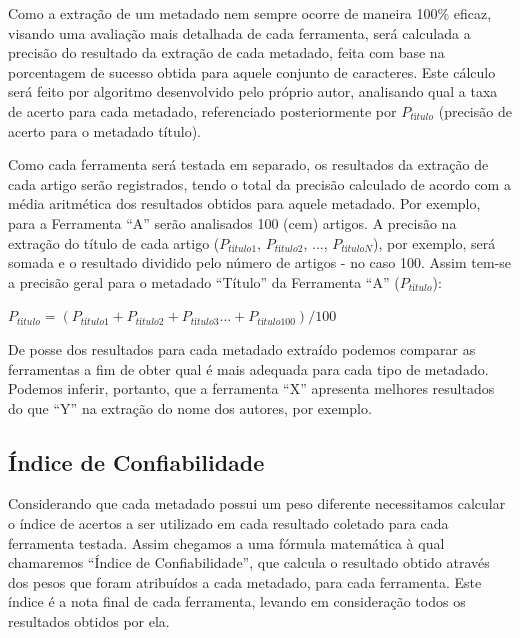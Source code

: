 Como a extração de um metadado nem sempre ocorre de maneira 100\% eficaz, visando uma avaliação mais detalhada de cada ferramenta, será calculada a precisão do resultado da extração de cada metadado, feita com base na porcentagem de sucesso obtida para aquele conjunto de caracteres. Este cálculo será feito por algoritmo desenvolvido pelo próprio autor, analisando qual a taxa de acerto para cada metadado, referenciado posteriormente por $P_{título}$ (precisão de acerto para o metadado título).

Como cada ferramenta será testada em separado, os resultados da extração de cada artigo serão registrados, tendo o total da precisão calculado de acordo com a média aritmética dos resultados obtidos para aquele metadado. Por exemplo, para a Ferramenta ``A'' serão analisados 100 (cem) artigos. A precisão na extração do título de cada artigo ($P_{título1}$, $P_{título2}$, ..., $P_{títuloN}$), por exemplo, será somada e o resultado dividido pelo número de artigos - no caso 100. Assim tem-se a precisão geral para o metadado ``Título'' da Ferramenta ``A'' ($P_{título}$):

\begin{center}
    \begin{math}
        P_{título} = (P_{título1} + P_{título2} + P_{título3} ... + P_{título100}) / 100
        \label{math:result-by-metadata}
    \end{math}
\end{center}

De posse dos resultados para cada metadado extraído podemos comparar as ferramentas a fim de obter qual é mais adequada para cada tipo de metadado. Podemos inferir, portanto, que a ferramenta ``X'' apresenta melhores resultados do que ``Y'' na extração do nome dos autores, por exemplo.

\subsection{Índice de Confiabilidade}
\label{ssec:confiability-index}


Considerando que cada metadado possui um peso diferente necessitamos calcular o índice de acertos a ser utilizado em cada resultado coletado para cada ferramenta testada. Assim chegamos a uma fórmula matemática à qual chamaremos ``Índice de Confiabilidade'', que calcula o resultado obtido através dos pesos que foram atribuídos a cada metadado, para cada ferramenta. Este índice é a nota final de cada ferramenta, levando em consideração todos os resultados obtidos por ela.

